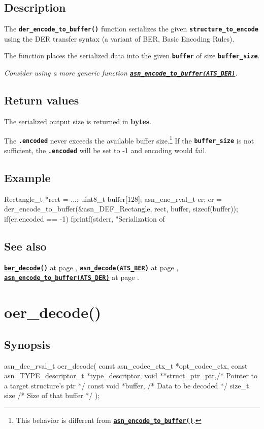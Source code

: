\documentclass[english,oneside,12pt]{book}
\newcommand{\apisection}[2]{\clearpage\section{\label{#1}#2}}
\newcommand{\api}[2]{\hyperref[#1]{\code{#2}}}
\newcommand{\seealso}[2]{\api{#1}{#2} at page \pageref{#1}}
\newcommand{\code}[1]{\texttt{\textbf{\lstinline{#1}}}}
\begin{document}
\subsection*{Description}

The \code{der_encode_to_buffer()} function serializes the given \code{structure_to_encode} using the DER transfer syntax (a variant of BER, Basic Encoding Rules).

The function places the serialized data into the given
\code{buffer} of size \code{buffer_size}.\newline

\noindent\emph{Consider using a more generic function \api{sec:asn_encode_to_buffer}{asn_encode_to_buffer(ATS_DER)}.}

\subsection*{Return values}


The serialized output size is returned in \textbf{bytes}.

The \code{.encoded} never exceeds the available buffer size.\footnote{This
behavior is different from \api{sec:asn_encode_to_buffer}{asn_encode_to_buffer()}.}
If the \code{buffer_size} is not sufficient, the \code{.encoded}
will be set to -1 and encoding would fail.

\subsection*{Example}
\begin{example}
Rectangle_t *rect = ...;
uint8_t buffer[128];
asn_enc_rval_t er;
er = der_encode_to_buffer(&asn_DEF_Rectangle, rect, buffer, sizeof(buffer));
if(er.encoded == -1) {
   fprintf(stderr, "Serialization of %
}
\end{example}

\subsection*{See also}
\seealso{sec:ber_decode}{ber_decode()},
\seealso{sec:asn_decode}{asn_decode(ATS_BER)},
\seealso{sec:asn_encode_to_buffer}{asn_encode_to_buffer(ATS_DER)}.

\apisection{sec:oer_decode}{oer\_decode()}

\subsection*{Synopsis}
\begin{signature}
asn_dec_rval_t oer_decode(
    const asn_codec_ctx_t *opt_codec_ctx,
    const asn_TYPE_descriptor_t *type_descriptor,
    void **struct_ptr_ptr,/* Pointer to a target structure's ptr */
    const void *buffer,   /* Data to be decoded */
    size_t size           /* Size of that buffer */
);
\end{signature}
\end{document}
